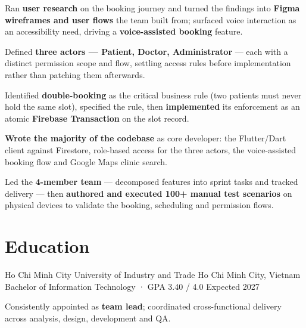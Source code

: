 \documentclass[a4paper,9pt]{extarticle}
\begin{document}

\begin{cvBullets}
  \item Ran \textbf{user research} on the booking journey and turned the findings into \textbf{Figma wireframes and user flows} the team built from; surfaced voice interaction as an accessibility need, driving a \textbf{voice-assisted booking} feature.
  \item Defined \textbf{three actors — Patient, Doctor, Administrator} — each with a distinct permission scope and flow, settling access rules before implementation rather than patching them afterwards.
  \item Identified \textbf{double-booking} as the critical business rule (two patients must never hold the same slot), specified the rule, then \textbf{implemented} its enforcement as an atomic \textbf{Firebase Transaction} on the slot record.
  \item \textbf{Wrote the majority of the codebase} as core developer: the Flutter/Dart client against Firestore, role-based access for the three actors, the voice-assisted booking flow and Google Maps clinic search.
  \item Led the \textbf{4-member team} — decomposed features into sprint tasks and tracked delivery — then \textbf{authored and executed 100+ manual test scenarios} on physical devices to validate the booking, scheduling and permission flows.
\end{cvBullets}


\section{Education}

\cvSchool
  {Ho Chi Minh City University of Industry and Trade}
  {Ho Chi Minh City, Vietnam}
  {Bachelor of Information Technology · GPA 3.40 / 4.0}
  {Expected 2027}

\begin{cvBullets}
  \item Consistently appointed as \textbf{team lead}; coordinated cross-functional delivery across analysis, design, development and QA.
\end{cvBullets}
\end{document}
